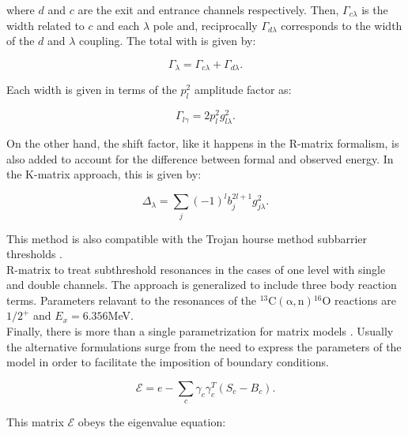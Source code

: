 \documentclass[openany]{book}
\begin{document}
where $d$ and $c$ are the exit and entrance channels respectively. Then, $\Gamma_{c\lambda}$ is the width related to $c$ and each $\lambda$ pole and, reciprocally $\Gamma_{d\lambda}$ corresponds to the width of the $d$ and $\lambda$ coupling. The total with is given by:

\begin{equation}\label{eq:rmatrix_kmatrix_totalWidth}
	\Gamma_\lambda = \Gamma_{c\lambda} + \Gamma_{d\lambda}.
\end{equation}

Each width is given in terms of the $p^2_l$ amplitude factor as:

\begin{equation}\label{eq:rmatrix_kmatrix_witdh}
	\Gamma_{l\gamma} = 2p^2_l g^2_{l\lambda}.
\end{equation}

On the other hand, the shift factor, like it happens in the R-matrix formalism, is also added to account for the difference between formal and observed energy. In the K-matrix approach, this is given by:

\begin{equation}\label{eq:rmatrix_kmatrix_shift}
	\Delta_\lambda = \sum_{j} (-1)^l b^{2l + 1}_j g^2_{j\lambda}.
\end{equation}

This method is also compatible with the Trojan hourse method subbarrier thresholds \cite{mukhamedzhanov_shubhchintak_bertulani_2017}. \\

R-matrix to treat subthreshold resonances in the cases of one level with single and double channels. The approach is generalized to include three body reaction terms. Parameters relavant to the resonances of the $\mathrm{{}^{13}C(\alpha, n){}^{16}O}$ reactions are $1/2^{+}$ and $E_x = 6.356$MeV. \\

Finally, there is more than a single parametrization for matrix models \cite{brune_2002}. Usually the alternative formulations surge from the need to express the parameters of the model in order to facilitate the imposition of boundary conditions.  

\begin{equation}\label{eq:rmatrix_E}
	\mathcal{E} = e - \sum_{c}{\gamma_c \gamma^{T}_c (S_c - B_c)}.
\end{equation}

This matrix $\mathcal{E}$ obeys the eigenvalue equation:
\end{document}
